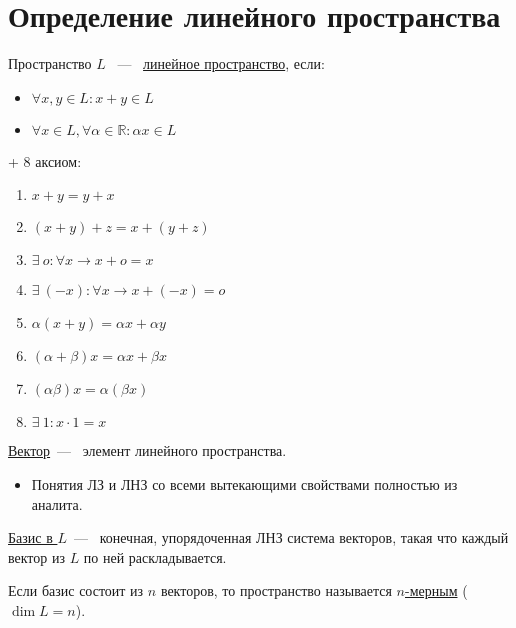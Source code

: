 \section{Определение линейного пространства}
\begin{definition} %
Пространство $L$ ~---~ \underline{линейное пространство}, если:
 \begin{itemize}
     \item $\forall x, y \in L: x + y \in L$
     \item $\forall x \in L, \forall \alpha \in \mathbb{R} : \alpha x \in L$
 \end{itemize}

  + 8 аксиом:
  \begin{enumerate}
      \item $x + y = y+x$
      \item $(x+y) +z=x +(y+z)$
      \item $\exists\ o : \forall x \rightarrow x+o=x$
      \item $\exists\ (-x):\forall x \rightarrow  x+(-x) = o$
      \item $\alpha(x+y) = \alpha x+\alpha y$
      \item $(\alpha +\beta)x = \alpha x+\beta x$
      \item $(\alpha\beta) x=\alpha(\beta x)$
      \item $\exists\ 1: x\cdot 1= x$
  \end{enumerate}
\end{definition} 
  \underline{Вектор}~---~ элемент линейного пространства.
  
  \begin{itemize}
      \item Понятия ЛЗ и ЛНЗ со всеми вытекающими свойствами полностью из аналита.
  \end{itemize}
  
\begin{definition}
  \underline{Базис в $L$}~---~ конечная, упорядоченная ЛНЗ система векторов, такая что каждый вектор из $L$ по ней раскладывается.
\end{definition}
  Если базис состоит из $n$ векторов, то пространство называется \underline{$n$-мерным} ($\dim L = n$). %
  \vspace{3mm}
  
